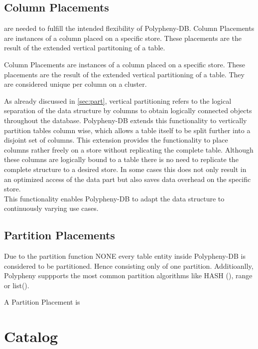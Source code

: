 \subsection{Column Placements} 
are needed to fulfill the intended flexibility of Polypheny-DB. 
    Column Placements are instances of a column placed on a specific store.
    These placements are the result of the extended vertical partitoning of a table.
    
Column Placements are instances of a column placed on a specific store.
These placements are the result of the extended vertical partitioning of a table.
They are considered unique per column on a cluster.

As already discussed in \ref{sec:part}, vertical partitioning refers to the logical 
separation of the data structure by columns to obtain logically connected objects throughout 
the database. 
Polypheny-DB extends this functionality to vertically partition tables
column wise, which allows a table itself to be split further into a disjoint 
set of columns. This extension provides the functionality to place columns 
rather freely on a store without replicating the complete table. 
Although these columns are logically bound to a table there is no need 
to replicate the complete structure to a desired store. In some cases 
this does not only result in an optimized access of the data part but 
also saves data overhead on the specific store.\\
This functionality enables Polypheny-DB to adapt the data structure to continuously 
varying use cases.\\



\subsection{Partition Placements}
Due to the partition function NONE every table entity inside Polypheny-DB is considered to be partitioned.  Hence consisting only of one partition.
Additioanlly, Polypheny suppports the most common partition algorithms like HASH (), range or list(). 

A Partition Placement is 




\section{Catalog}



